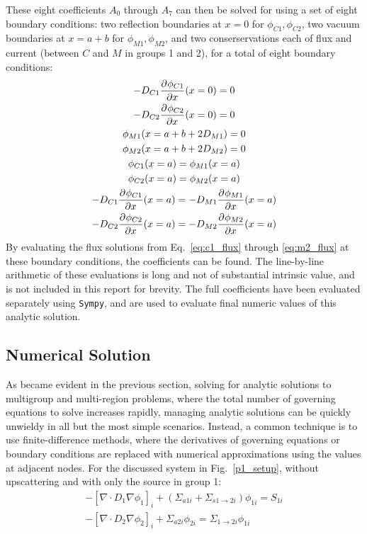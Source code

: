 \documentclass[11pt]{article} %
\newcommand{\figref}[1]{Fig.~\ref{#1}}
\begin{document}
These eight coefficients $A_0$ through $A_7$ can then be solved for using a set of eight boundary conditions: two reflection boundaries at $x=0$ for $\phi_{C1},\phi_{C2}$, two vacuum boundaries at $x=a+b$ for $\phi_{M1},\phi_{M2}$, and two conserservations each of flux and current (between $C$ and $M$ in groups 1 and 2), for a total of eight boundary conditions:
\begin{equation}
\begin{gathered}
    -D_{C1}\frac{\partial^{}\phi_{C1}}{\partial{x}^{}}(x=0)=0\\
    -D_{C2}\frac{\partial^{}\phi_{C2}}{\partial{x}^{}}(x=0)=0\\
    {\phi_{M1}}({x=a+b+2D_{M1}})=0\\
    {\phi_{M2}}({x=a+b+2D_{M2}})=0\\
    \phi_{C1}(x=a)=\phi_{M1}(x=a)\\
    \phi_{C2}(x=a)=\phi_{M2}(x=a)\\
    -D_{C1}\frac{\partial^{}\phi_{C1}}{\partial{x}^{}}(x=a)=-D_{M1}\frac{\partial^{}\phi_{M1}}{\partial{x}^{}}(x=a)\\
    -D_{C2}\frac{\partial^{}\phi_{C2}}{\partial{x}^{}}(x=a)=-D_{M2}\frac{\partial^{}\phi_{M2}}{\partial{x}^{}}(x=a)
\end{gathered}
\label{eq:bounds}
\end{equation}
By evaluating the flux solutions from Eq.~\ref{eq:c1_flux} through \ref{eq:m2_flux} at these boundary conditions, the coefficients can be found.
The line-by-line arithmetic of these evaluations is long and not of substantial intrinsic value, and is not included in this report for brevity.
The full coefficients have been evaluated separately using \texttt{Sympy}, and are used to evaluate final numeric values of this analytic solution.\cite{novak_computer_2026}

\subsection{Numerical Solution}
As became evident in the previous section, solving for analytic solutions to multigroup and multi-region problems, where the total number of governing equations to solve increases rapidly, managing analytic solutions can be quickly unwieldy in all but the most simple scenarios.
Instead, a common technique is to use finite-difference methods, where the derivatives of governing equations or boundary conditions are replaced with numerical approximations using the values at adjacent nodes.
For the discussed system in \figref{p1_setup}, without upscattering and with only the source in group 1:\\
\begin{equation}
    \begin{aligned}
        - [\nabla\cdot D_1\nabla\phi_1]_i + (\Sigma_{a1i}+\Sigma_{s1\rightarrow 2i})\phi_{1i}= S_{1i}\\
        - [\nabla\cdot D_2\nabla\phi_2]_i + \Sigma_{a2i}\phi_{2i}= \Sigma_{1\rightarrow2i}\phi_{1i}\\
    \label{eq:multigroup-diff-nospace}
    \end{aligned}
\end{equation}
\end{document}
